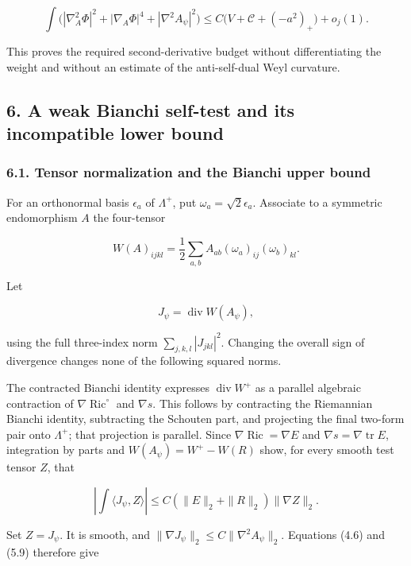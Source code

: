 \documentclass[
  11pt,
]{article}
\begin{document}
\[
 \int\bigl(|\nabla_A^2\Phi|^2+|\nabla_A\Phi|^4
                                      +|\nabla^2A_\psi|^2\bigr)
       \le C\bigl(V+\mathcal C+(-a^2)_+\bigr)+o_j(1).
 \tag{5.9}
\]

This proves the required second-derivative budget without
differentiating the weight and without an estimate of the anti-self-dual
Weyl curvature.

\hypertarget{a-weak-bianchi-self-test-and-its-incompatible-lower-bound}{%
\subsection{6. A weak Bianchi self-test and its incompatible lower
bound}\label{a-weak-bianchi-self-test-and-its-incompatible-lower-bound}}

\hypertarget{tensor-normalization-and-the-bianchi-upper-bound}{%
\subsubsection{6.1. Tensor normalization and the Bianchi upper
bound}\label{tensor-normalization-and-the-bianchi-upper-bound}}

For an orthonormal basis \(\epsilon_a\) of \(\Lambda^+\), put
\(\omega_a=\sqrt2\epsilon_a\). Associate to a symmetric endomorphism
\(A\) the four-tensor

\[
 W(A)_{ijkl}=\frac12\sum_{a,b}A_{ab}(\omega_a)_{ij}(\omega_b)_{kl}.
 \tag{6.1}
\]

Let

\[
                    J_\psi=\operatorname{div}W(A_\psi),
\]

using the full three-index norm \(\sum_{j,k,l}|J_{jkl}|^2\). Changing
the overall sign of divergence changes none of the following squared
norms.

The contracted Bianchi identity expresses \(\operatorname{div}W^+\) as a
parallel algebraic contraction of \(\nabla\operatorname{Ric}^\circ\) and
\(\nabla s\). This follows by contracting the Riemannian Bianchi
identity, subtracting the Schouten part, and projecting the final
two-form pair onto \(\Lambda^+\); that projection is parallel. Since
\(\nabla\operatorname{Ric}=\nabla E\) and
\(\nabla s=\nabla\operatorname{tr}E\), integration by parts and
\(W(A_\psi)=W^+-W(R)\) show, for every smooth test tensor \(Z\), that

\[
 \left|\int\langle J_\psi,Z\rangle\right|
       \le C(\|E\|_2+\|R\|_2)\|\nabla Z\|_2.
 \tag{6.2}
\]

Set \(Z=J_\psi\). It is smooth, and
\(\|\nabla J_\psi\|_2\le C\|\nabla^2A_\psi\|_2\). Equations (4.6) and
(5.9) therefore give
\end{document}
